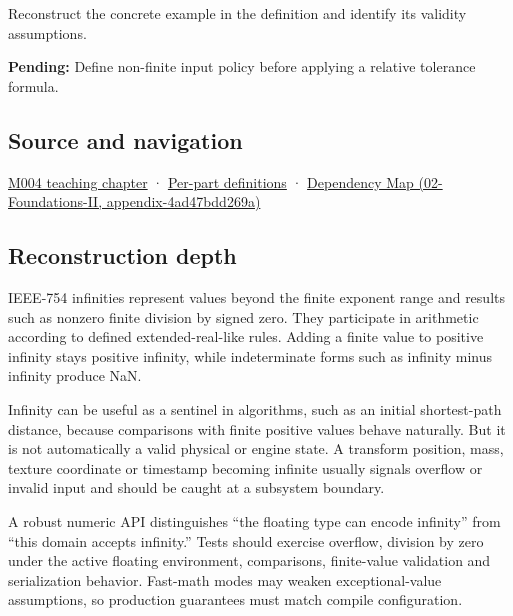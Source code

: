 Reconstruct the concrete example in the definition and identify its validity assumptions.

\textbf{Pending:} Define non-finite input policy before applying a relative tolerance formula.

\subsection{Source and navigation}\label{source-and-navigation}

\href{Continuous\%20Notes/Computing\%20Foundations\%20-\%20From\%20Bits\%20to\%20C++\%20and\%20Systems\%20APIs\#A\%20stretching\%20ruler\%20for\%20real-valued\%20quantities}{M004 teaching chapter} · \hyperref[appendix-fd090d982a15]{Per-part definitions} · \href{}{Dependency Map (02-Foundations-II, appendix-4ad47bdd269a)}

\subsection{Reconstruction depth}\label{reconstruction-depth}

IEEE-754 infinities represent values beyond the finite exponent range and results such as nonzero finite division by signed zero. They participate in arithmetic according to defined extended-real-like rules. Adding a finite value to positive infinity stays positive infinity, while indeterminate forms such as infinity minus infinity produce NaN.

Infinity can be useful as a sentinel in algorithms, such as an initial shortest-path distance, because comparisons with finite positive values behave naturally. But it is not automatically a valid physical or engine state. A transform position, mass, texture coordinate or timestamp becoming infinite usually signals overflow or invalid input and should be caught at a subsystem boundary.

A robust numeric API distinguishes ``the floating type can encode infinity'' from ``this domain accepts infinity.'' Tests should exercise overflow, division by zero under the active floating environment, comparisons, finite-value validation and serialization behavior. Fast-math modes may weaken exceptional-value assumptions, so production guarantees must match compile configuration.

